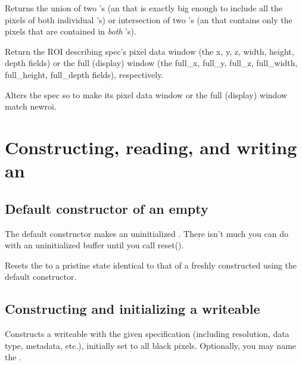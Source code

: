 Returns the union of two \ROI's (an \ROI that is exactly big enough
to include all the pixels of both individual \ROI's) or intersection
of two \ROI's (an \ROI that contains only the pixels that are contained
in \emph{both} \ROI's).
\apiend

Return the ROI describing {\cf spec}'s pixel data window (the {\cf x, y, z,
width, height, depth} fields)
or the full (display) window (the {\cf full_x, full_y, full_z,
full_width, full_height, full_depth} fields), respectively.
\apiend

Alters the {\cf spec} so to make its pixel data window 
or the full (display) window match {\cf newroi}.
\apiend



\section{Constructing, reading, and writing an \ImageBuf}

\subsection*{Default constructor of an empty \ImageBuf}

The default constructor makes an uninitialized \ImageBuf.  There isn't
much you can do with an uninitialized buffer until you call {\cf reset()}.
\apiend

Resets the \ImageBuf to a pristine state identical to that of a freshly
constructed \ImageBuf using the default constructor.
\apiend


\subsection*{Constructing and initializing a writeable \ImageBuf}

Constructs a writeable \ImageBuf with the given specification (including
resolution, data type, metadata, etc.), initially set to all black pixels.
Optionally, you may name the \ImageBuf.
\apiend

